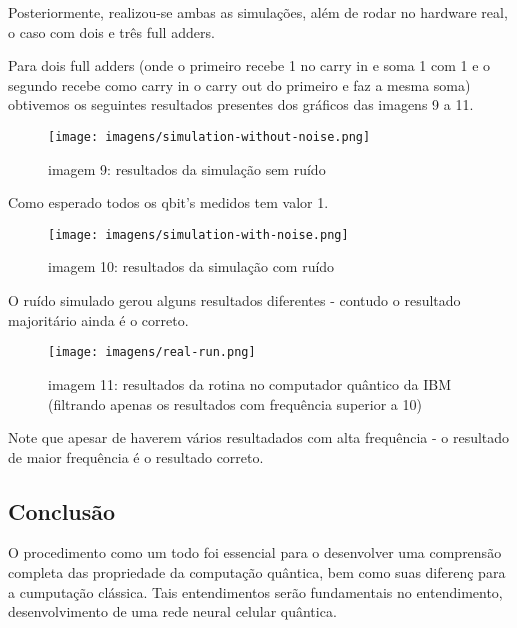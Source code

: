 \documentclass[12pt, a4paper]{article} %
\begin{document}
        Posteriormente, realizou-se ambas as simula\c{c}\~oes, al\'em de rodar no hardware real, o caso com dois e tr\^es full adders.

        Para dois full adders (onde o primeiro recebe 1 no carry in e soma 1 com 1 e o segundo recebe como carry in o carry out do primeiro e faz a mesma soma) obtivemos os seguintes resultados presentes dos gr\'aficos das imagens 9 a 11.

        \begin{figure}[H]
        
        \centering
        
        \texttt{[image: imagens/simulation-without-noise.png]}
        
        imagem 9: resultados da simula\c{c}\~ao sem ru\'ido
        
        \end{figure}

        Como esperado todos os qbit's medidos tem valor 1.

        \begin{figure}[H]
        
        \centering
        
        \texttt{[image: imagens/simulation-with-noise.png]}
        
        imagem 10: resultados da simula\c{c}\~ao com ru\'ido
        
        \end{figure}

        O ru\'ido simulado gerou alguns resultados diferentes - contudo o resultado majorit\'ario ainda \'e o correto.
        
        \begin{figure}[H]
        
        \centering
        
        \texttt{[image: imagens/real-run.png]}
        
        imagem 11: resultados da rotina no computador qu\^antico da IBM (filtrando apenas os resultados com frequ\^encia superior a 10)
        
        \end{figure}

        Note que apesar de haverem v\'arios resultadados com alta frequ\^encia - o resultado de maior frequ\^encia é o resultado correto.
    
    \subsection{Conclusão}
    
        O procedimento como um todo foi essencial para o desenvolver uma comprensão completa das propriedade da computa\c{c}\~ao qu\^antica, bem como suas diferen\c{c} para a cumputa\c{c}\~ao cl\'assica. Tais entendimentos ser\~ao fundamentais no entendimento, desenvolvimento de uma rede neural celular qu\^antica.



    
\end{document}

